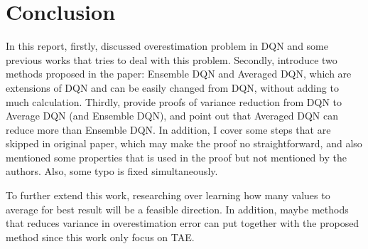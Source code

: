 \section{Conclusion}
\label{section:conclusion}
In this report, firstly, discussed overestimation problem in DQN and some previous works that tries to deal with this problem. Secondly, introduce two methods proposed in the paper: Ensemble DQN and Averaged DQN, which are extensions of DQN and can be easily changed from DQN, without adding to much calculation. Thirdly, provide proofs of variance reduction from DQN to Average DQN (and Ensemble DQN), and point out that Averaged DQN can reduce more than Ensemble DQN. In addition, I cover some steps that are skipped in original paper, which may make the proof no straightforward, and also mentioned some properties that is used in the proof but not mentioned by the authors. Also, some typo is fixed simultaneously.
\par To further extend this work, researching over learning how many values to average for best result will be a feasible direction. In addition, maybe methods that reduces variance in overestimation error can put together with the proposed method since this work only focus on TAE. 

\iffalse
Please provide succinct concluding remarks for your report. You may discuss the following aspects:
\begin{itemize}
    \item The potential future research directions
    \item Any technical limitations
    \item Any latest results on the problem of interest
\end{itemize}
\fi
